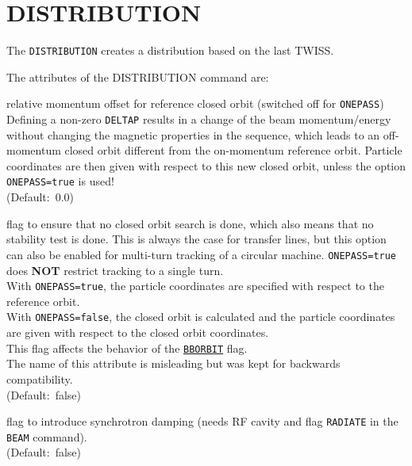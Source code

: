 \section{DISTRIBUTION}
\label{sec:track}

The \texttt{DISTRIBUTION} creates a distribution based on the last TWISS.  



The attributes of the DISTRIBUTION command are:

\begin{madlist}
   relative momentum offset for reference closed orbit (switched
  off for \texttt{ONEPASS}) \\  
  Defining a non-zero \texttt{DELTAP} results in a change of the beam
  momentum/energy without changing the magnetic properties in the
  sequence, which leads to an off-momentum closed orbit different from
  the on-momentum reference orbit. Particle coordinates are then given
  with respect to this new closed orbit, unless the option
  \texttt{ONEPASS=true} is used! \\  
  (Default:~0.0)

   flag to ensure that no closed orbit search is done,
  which also means that no stability test is done. This is always the
  case for transfer lines, but this option can also be enabled for
  multi-turn tracking of a circular machine. \texttt{ONEPASS=true} does
  \textbf{NOT} restrict tracking to a single turn. \\
  With \texttt{ONEPASS=true}, the particle coordinates are specified with
  respect to the reference orbit. \\  
  With \texttt{ONEPASS=false}, the closed orbit is calculated and the particle
  coordinates are given with respect to the closed orbit coordinates.\\
  This flag affects the behavior of the \hyperref[sec:option]{\texttt{BBORBIT}} flag. \\
  The name of this attribute is misleading but was kept for backwards
  compatibility.  \\ 
  (Default:~false)

   flag to introduce synchrotron damping (needs RF cavity
  and flag \texttt{RADIATE} in the \texttt{BEAM} command). \\ (Default:~false)


\end{madlist}
